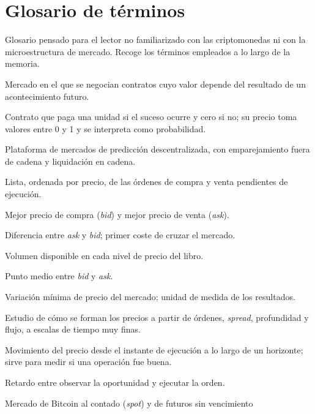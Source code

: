 
\chapter{Glosario de términos}
\label{anexo:glosario}

Glosario pensado para el lector no familiarizado con las criptomonedas ni con la
microestructura de mercado. Recoge los términos empleados a lo largo de la memoria.

\begin{description}[align=left, leftmargin=3.2cm, labelwidth=3cm, font=\bfseries]
\item[Mercado de predicción] Mercado en el que se negocian contratos cuyo valor depende del
resultado de un acontecimiento futuro.
\item[Contrato binario] Contrato que paga una unidad si el suceso ocurre y cero si no; su
precio toma valores entre 0 y 1 y se interpreta como probabilidad.
\item[Polymarket] Plataforma de mercados de predicción descentralizada, con emparejamiento
fuera de cadena y liquidación en cadena.
\item[Libro de órdenes (LOB)] Lista, ordenada por precio, de las órdenes de compra y venta
pendientes de ejecución.
\item[Bid / Ask] Mejor precio de compra (\emph{bid}) y mejor precio de venta (\emph{ask}).
\item[Spread] Diferencia entre \emph{ask} y \emph{bid}; primer coste de cruzar el mercado.
\item[Profundidad] Volumen disponible en cada nivel de precio del libro.
\item[Precio medio (\emph{mid})] Punto medio entre \emph{bid} y \emph{ask}.
\item[Tick] Variación mínima de precio del mercado; unidad de medida de los resultados.
\item[Microestructura] Estudio de cómo se forman los precios a partir de órdenes, \emph{spread},
profundidad y flujo, a escalas de tiempo muy finas.
\item[Markout] Movimiento del precio desde el instante de ejecución a lo largo de un horizonte;
sirve para medir si una operación fue buena.
\item[Latencia] Retardo entre observar la oportunidad y ejecutar la orden.
\item[Spot / Perpetuo] Mercado de Bitcoin al contado (\emph{spot}) y de futuros sin vencimiento

\end{description}

